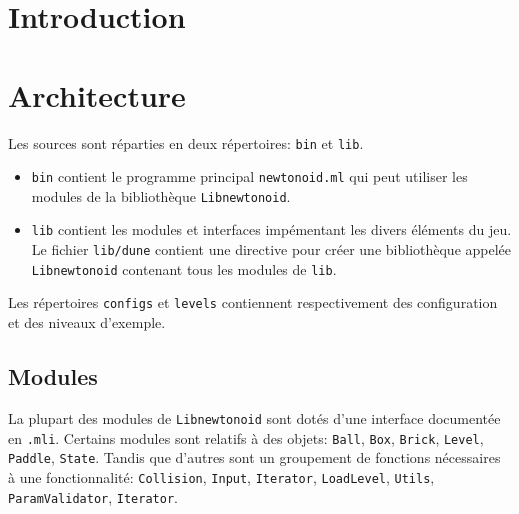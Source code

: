 \documentclass[french]{template}
\begin{document}

\fairemarges
\fairepagedegarde
\tabledematieres

\newpage

\section{Introduction}

\section{Architecture}

Les sources sont réparties en deux répertoires: \texttt{bin} et \texttt{lib}.

\begin{itemize}
    \item \texttt{bin} contient le programme principal \texttt{newtonoid.ml} qui peut utiliser les modules de la bibliothèque \texttt{Libnewtonoid}.
    \item \texttt{lib} contient les modules et interfaces impémentant les divers éléments du jeu. Le fichier \texttt{lib/dune} contient une directive pour créer une bibliothèque appelée \texttt{Libnewtonoid} contenant tous les modules de \texttt{lib}.
\end{itemize}

Les répertoires \texttt{configs} et \texttt{levels} contiennent respectivement des configuration et des niveaux d'exemple.

\subsection{Modules}

La plupart des modules de \texttt{Libnewtonoid} sont dotés d'une interface documentée en \texttt{.mli}. Certains modules sont relatifs à des objets: \texttt{Ball}, \texttt{Box}, \texttt{Brick}, \texttt{Level}, \texttt{Paddle}, \texttt{State}. Tandis que d'autres sont un groupement de fonctions nécessaires à une fonctionnalité: \texttt{Collision}, \texttt{Input}, \texttt{Iterator}, \texttt{LoadLevel}, \texttt{Utils}, \texttt{ParamValidator}, \texttt{Iterator}.
\end{document}
